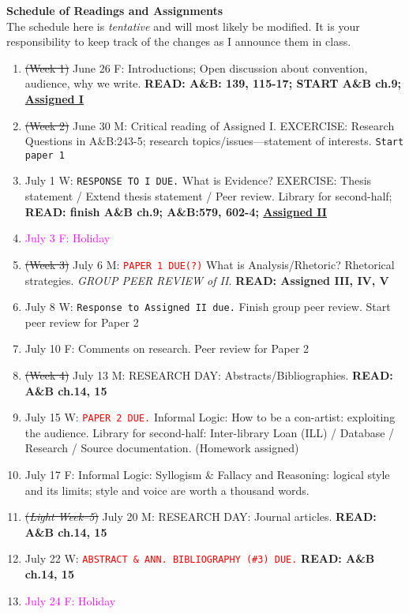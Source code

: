\documentclass [11pt]{article}
\begin{document}
   {\bf  Schedule of Readings and Assignments}\\
   The schedule here is {\it tentative} and will most likely be modified. It is your responsibility to keep track of the changes as I announce them in class.
   \begin{enumerate}
\item \sout{(Week 1)} June 26 F:  Introductions;  Open discussion about convention, audience, why we write. \textbf{READ: A\&B: 139, 115-17; START A\&B ch.9; \href{http://www.newyorker.com/reporting/2007/04/16/070416fa_fact_colapinto}{Assigned I}} 

\item \sout{(Week 2)} June 30 M: Critical reading of Assigned I. EXCERCISE: Research Questions in A\&B:243-5; research topics/issues---statement of interests. \texttt{Start paper 1}
\item[] July 1 W: \texttt{RESPONSE TO I DUE.} What is Evidence? EXERCISE: Thesis statement / Extend thesis statement / Peer review. Library for second-half;  \textbf{ READ: finish A\&B ch.9; A\&B:579, 602-4; \href{http://www.llc.ilstu.edu/dlevere/docs/currentanthroarticle.web.pdf}{Assigned II}}
\item[] \textcolor{magenta}{July 3 F: Holiday}

\item \sout{(Week 3)} July 6 M: \textcolor{red}{\texttt{PAPER 1 DUE(?)}} What is Analysis/Rhetoric? Rhetorical strategies. \textsl{GROUP PEER REVIEW of II.} {\bf READ: Assigned III, IV, V}   
\item[] July 8 W: \texttt{Response to Assigned II due.} Finish group peer review. Start peer review for Paper 2  
\item[] July 10 F: Comments on research. Peer review for Paper 2

\item \sout{(Week 4)} July 13 M: RESEARCH DAY: Abstracts/Bibliographies. {\bf READ: A\&B ch.14, 15}
\item[] July 15 W: \textcolor{red}{\texttt{PAPER 2 DUE.}} Informal Logic: How to be a con-artist: exploiting the audience. Library for second-half: Inter-library Loan (ILL) / Database / Research / Source documentation. (Homework assigned)
\item[] July 17 F: Informal Logic: Syllogism \& Fallacy and Reasoning: logical style and its limits; style and voice are worth a thousand words. 

\item \sout{({\sl Light Week--5})} July 20 M: RESEARCH DAY: Journal articles. {\bf READ: A\&B ch.14, 15}
\item[] July 22 W: \textcolor{red}{\texttt{ABSTRACT \& ANN. BIBLIOGRAPHY (\#3) DUE.}} {\bf READ: A\&B ch.14, 15} 
\item[] \textcolor{magenta}{July 24 F: Holiday}


\end{enumerate}
\end{document}
